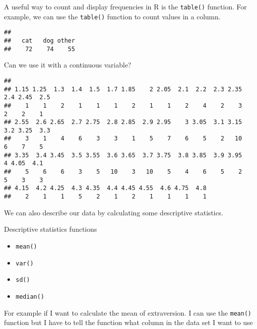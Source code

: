\documentclass[
]{article}
\newenvironment{Shaded}{\begin{snugshade}}{\end{snugshade}}
\newcommand{\FunctionTok}[1]{\textcolor[rgb]{0.13,0.29,0.53}{\textbf{#1}}}
\newcommand{\NormalTok}[1]{#1}
\newcommand{\SpecialCharTok}[1]{\textcolor[rgb]{0.81,0.36,0.00}{\textbf{#1}}}
\providecommand{\tightlist}{%
  \setlength{\itemsep}{0pt}\setlength{\parskip}{0pt}}
\begin{document}
A useful way to count and display frequencies in R is the
\texttt{table()} function. For example, we can use the \texttt{table()}
function to count values in a column.

\begin{Shaded}
\end{Shaded}

\begin{verbatim}
## 
##   cat   dog other 
##    72    74    55
\end{verbatim}

Can we use it with a continuous variable?

\begin{Shaded}
\end{Shaded}

\begin{verbatim}
## 
## 1.15 1.25  1.3  1.4  1.5  1.7 1.85    2 2.05  2.1  2.2  2.3 2.35  2.4 2.45  2.5 
##    1    1    2    1    1    1    2    1    1    2    4    2    3    2    2    1 
## 2.55  2.6 2.65  2.7 2.75  2.8 2.85  2.9 2.95    3 3.05  3.1 3.15  3.2 3.25  3.3 
##    3    1    4    6    3    3    1    5    7    6    5    2   10    6    7    5 
## 3.35  3.4 3.45  3.5 3.55  3.6 3.65  3.7 3.75  3.8 3.85  3.9 3.95    4 4.05  4.1 
##    5    6    6    3    5   10    3   10    5    4    6    5    2    5    3    3 
## 4.15  4.2 4.25  4.3 4.35  4.4 4.45 4.55  4.6 4.75  4.8 
##    2    1    1    5    2    1    2    1    1    1    1
\end{verbatim}

We can also describe our data by calculating some descriptive
statistics.

Descriptive statistics functions

\begin{itemize}
\tightlist
\item
  \texttt{mean()}
\item
  \texttt{var()}
\item
  \texttt{sd()}
\item
  \texttt{median()}
\end{itemize}

For example if I want to calculate the mean of extraversion. I can use
the \texttt{mean()} function but I have to tell the function what column
in the data set I want to use
\end{document}

